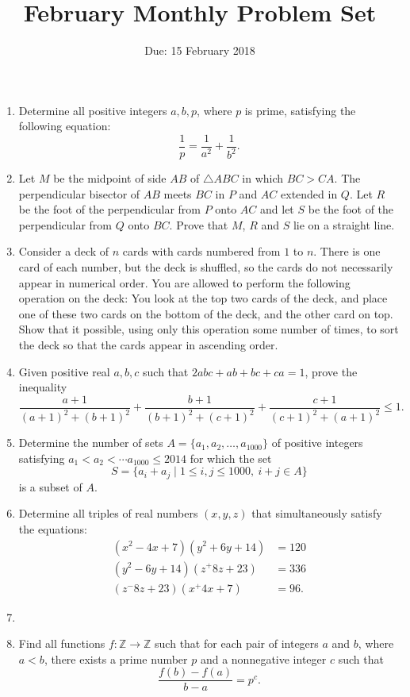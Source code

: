 \documentclass[12pt]{article}
\title{February Monthly Problem Set}
\author{Due: 15 February 2018}
\date{}
\begin{document}
 \maketitle

\begin{enumerate}

\item %
Determine all positive integers $a,b,p$, where $p$ is prime, satisfying the following equation:
  \[ \frac{1}{p} = \frac{1}{a^2} + \frac{1}{b^2}. \]


\item %
Let $M$ be the midpoint of side $AB$ of $\triangle ABC$ in which $BC>CA$. The perpendicular bisector of $AB$ meets $BC$ in $P$ and $AC$ extended in $Q$. Let $R$ be the foot of the perpendicular from $P$ onto $AC$ and let $S$ be the foot of the perpendicular from $Q$ onto $BC$. Prove that $M$, $R$ and $S$ lie on a straight line.


\item %
Consider a deck of $n$ cards with cards numbered from $1$ to $n$. There is one card of each number, but the deck is shuffled, so the cards do not necessarily appear in numerical order. You are allowed to perform the following operation on the deck: You look at the top two cards of the deck, and place one of these two cards on the bottom of the deck, and the other card on top. Show that it possible, using only this operation some number of times, to sort the deck so that the cards appear in ascending order. 


\item %
Given positive real $a,b,c$ such that $2abc+ab+bc+ca = 1$, prove the inequality
\[ \frac{a+1}{(a+1)^2+(b+1)^2} +\frac{b+1}{(b+1)^2+(c+1)^2} +\frac{c+1}{(c+1)^2+(a+1)^2} \leq 1. \]


\item %
Determine the number of sets $A = \{a_1,a_2,\ldots, a_{1000}\}$ of positive integers satisfying $a_1 < a_2 < \cdots a_{1000} \le 2014$ for which the set
	\[ S = \{a_i+a_j \mid 1\le i,j\le 1000,\ i+j\in A\} \]
is a subset of $A$.


\item %
Determine all triples of real numbers $(x,y,z)$ that simultaneously satisfy the equations:
\begin{align*}
	(x^2 − 4x + 7)(y^2 + 6y + 14) &= 120 \\
	(y^2 − 6y + 14)(z^ + 8z + 23) &= 336 \\
	(z^ − 8z + 23)(x^ + 4x + 7) &= 96.
\end{align*}


\item %


\item %
Find all functions $f : \mathbb{Z} \to \mathbb{Z}$ such that for each pair of integers $a$ and $b$, where $a < b$, there exists a prime number $p$ and a nonnegative integer $c$ such that \[ \frac{f(b)-f(a)}{b-a} = p^c. \]


\end{enumerate}
\end{document}
